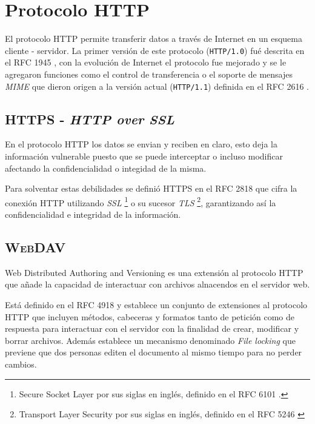 \section {Protocolo \textsc{HTTP}}

El protocolo \textsc{HTTP} permite transferir datos a trav\'{e}s de Internet en un esquema cliente - servidor. La primer versi\'{o}n de este protocolo (\verb|HTTP/1.0|) fu\'{e} descrita en el \textsc{RFC} 1945 \cite{_rfc_????-1}, con la evoluci\'{o}n de Internet el protocolo fue mejorado y se le agregaron funciones como el control de transferencia o el soporte de mensajes \textit{MIME} que dieron origen a la versi\'{o}n actual (\verb|HTTP/1.1|) definida en el RFC 2616 \cite{_rfc_????}.

  \subsection {\textsc{HTTPS} - \textit{HTTP over SSL}}

En el protocolo \textsc{HTTP} los datos se envian y reciben en claro, esto deja la informaci\'{o}n vulnerable puesto que se puede interceptar o incluso modificar afectando la confidencialidad o integidad de la misma.

Para solventar estas debilidades se defini\'{o} \textsc{HTTPS} en el \textsc{RFC} 2818 \cite{_rfc_????-6} que cifra la conexi\'{o}n \textsc{HTTP} utilizando \textit{SSL} \footnote{Secure Socket Layer por sus siglas en ingl\'{e}s, definido en el \textsc{RFC} 6101 \cite{_rfc_????-4}.} o su sucesor \textit{TLS} \footnote{Transport Layer Security por sus siglas en ingl\'{e}s, definido en el \textsc{RFC} 5246 \cite{_rfc_????-3}}, garantizando as\'{i} la confidencialidad e integridad de la informaci\'{o}n.

  \subsection {\textsc{WebDAV}}

Web Distributed Authoring and Versioning es una extensi\'{o}n al protocolo \textsc{HTTP} que a\~{n}ade la capacidad de interactuar con archivos alnacendos en el servidor web.

Est\'{a} definido en el \textsc{RFC} 4918 \cite{_rfc_????-2} y establece un conjunto de extensiones al protocolo \textsc{HTTP} que incluyen m\'{e}todos, cabeceras y formatos tanto de petici\'{o}n como de respuesta para interactuar con el servidor con la finalidad de crear, modificar y borrar archivos. Adem\'{a}s establece un mecanismo denominado \textit{File locking} que previene que dos personas editen el documento al mismo tiempo para no perder cambios.

